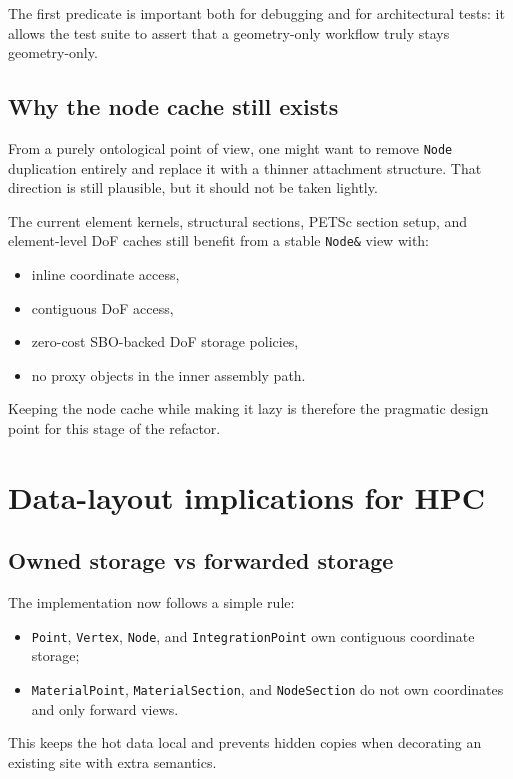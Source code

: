 The first predicate is important both for debugging and for architectural
tests: it allows the test suite to assert that a geometry-only workflow truly
stays geometry-only.

\subsection{Why the node cache still exists}

From a purely ontological point of view, one might want to remove
\texttt{Node} duplication entirely and replace it with a thinner attachment
structure.  That direction is still plausible, but it should not be taken
lightly.

The current element kernels, structural sections, PETSc section setup, and
element-level DoF caches still benefit from a stable \texttt{Node\&} view with:
\begin{itemize}[nosep]
  \item inline coordinate access,
  \item contiguous DoF access,
  \item zero-cost SBO-backed DoF storage policies,
  \item no proxy objects in the inner assembly path.
\end{itemize}

Keeping the node cache while making it lazy is therefore the pragmatic design
point for this stage of the refactor.

\section{Data-layout implications for HPC}

\subsection{Owned storage vs forwarded storage}

The implementation now follows a simple rule:
\begin{itemize}[nosep]
  \item \texttt{Point}, \texttt{Vertex}, \texttt{Node}, and
        \texttt{IntegrationPoint} own contiguous coordinate storage;
  \item \texttt{MaterialPoint}, \texttt{MaterialSection}, and
        \texttt{NodeSection} do not own coordinates and only forward views.
\end{itemize}

This keeps the hot data local and prevents hidden copies when decorating an
existing site with extra semantics.

